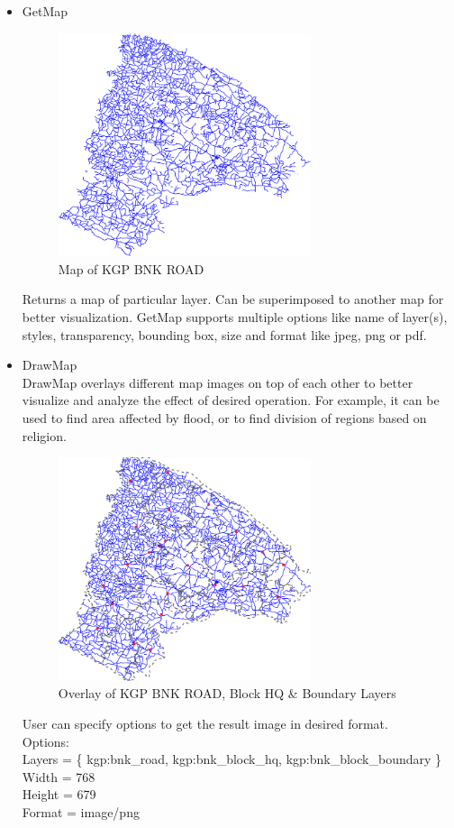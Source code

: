 \begin{itemize}
\item GetMap\\
\begin{figure}[H]
	\centering
  \includegraphics[width=0.7\textwidth]{bnk}
	\caption{Map of KGP BNK ROAD}
\end{figure}
Returns a map of particular layer. Can be superimposed to another map for better visualization. GetMap supports multiple options like name of layer(s), styles, transparency, bounding box, size and format like jpeg, png or pdf. 
\item DrawMap\\
DrawMap overlays different map images on top of each other to better visualize and analyze the effect of desired operation. For example, it can be used to find area affected by flood, or to find division of regions based on religion.\\
\begin{figure}[H]
	\centering
  \includegraphics[width=0.7\textwidth]{9}
	\caption{Overlay of KGP BNK ROAD, Block HQ \& Boundary Layers}
\end{figure}
User can specify options to get the result image in desired format.\\
Options:\\
Layers = \{ kgp:bnk\_road, kgp:bnk\_block\_hq, kgp:bnk\_block\_boundary \}\\
Width = 768\\
Height = 679\\
Format = image/png


\end{itemize}
